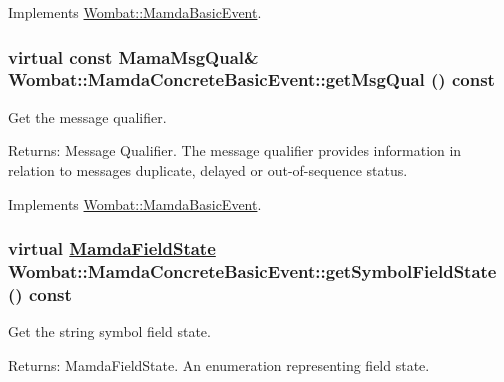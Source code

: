 Implements \hyperlink{classWombat_1_1MamdaBasicEvent_b0602a83bec20cd8b341ec866ff3bffa}{Wombat::Mamda\-Basic\-Event}.\hypertarget{classWombat_1_1MamdaConcreteBasicEvent_101e62bfb580c30b876cbb5014b22ab4}{
\subsubsection[getMsgQual]{\setlength{\rightskip}{0pt plus 5cm}virtual const Mama\-Msg\-Qual\& Wombat::Mamda\-Concrete\-Basic\-Event::get\-Msg\-Qual () const}}
\label{classWombat_1_1MamdaConcreteBasicEvent_101e62bfb580c30b876cbb5014b22ab4}


Get the message qualifier. 

\begin{Desc}
\item[Returns:]Message Qualifier. The message qualifier provides information in relation to messages duplicate, delayed or out-of-sequence status. \end{Desc}


Implements \hyperlink{classWombat_1_1MamdaBasicEvent_675ce8f1de581548426335423d6b3864}{Wombat::Mamda\-Basic\-Event}.\hypertarget{classWombat_1_1MamdaConcreteBasicEvent_1fb58780b5232b8a07cc86c745721257}{
\subsubsection[getSymbolFieldState]{\setlength{\rightskip}{0pt plus 5cm}virtual \hyperlink{namespaceWombat_93aac974f2ab713554fd12a1fa3b7d2a}{Mamda\-Field\-State} Wombat::Mamda\-Concrete\-Basic\-Event::get\-Symbol\-Field\-State () const}}
\label{classWombat_1_1MamdaConcreteBasicEvent_1fb58780b5232b8a07cc86c745721257}


Get the string symbol field state. 

\begin{Desc}
\item[Returns:]Mamda\-Field\-State. An enumeration representing field state. \end{Desc}


